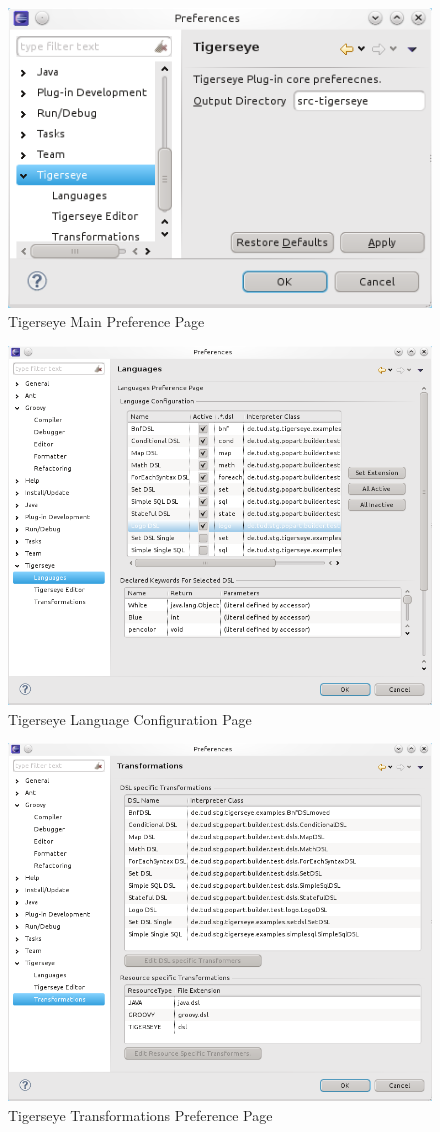	\begin{figure}
	  \centering
	  \includegraphics[width=.5\textwidth,keepaspectratio=true]{./pics/preferences_main.png}
	  \caption{Tigerseye Main Preference Page}
	  \label{fig:prefs_main}
	\end{figure}

	\begin{figure}
	  \centering
	  \includegraphics[width=.5\textwidth,keepaspectratio=true]{./pics/preferences_languages.png}
	  \caption{Tigerseye Language Configuration Page}
	  \label{fig:prefs_languages}
	\end{figure}

	\begin{figure}
	  \centering
	  \includegraphics[width=.5\textwidth,keepaspectratio=true]{./pics/preferences_transformations.png}
	  \caption{Tigerseye Transformations Preference Page}
	  \label{fig:prefs_transformations}
	\end{figure}

